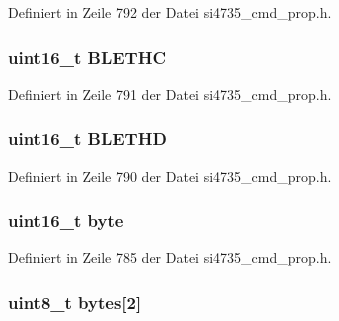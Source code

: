 Definiert in Zeile 792 der Datei si4735\+\_\+cmd\+\_\+prop.\+h.

\hypertarget{unionfm__rds__config_a19e09ee442964285a5affbdbe4d59795}{}
\subsubsection[{B\+L\+E\+T\+H\+C}]{\setlength{\rightskip}{0pt plus 5cm}uint16\+\_\+t B\+L\+E\+T\+H\+C}\label{unionfm__rds__config_a19e09ee442964285a5affbdbe4d59795}


Definiert in Zeile 791 der Datei si4735\+\_\+cmd\+\_\+prop.\+h.

\hypertarget{unionfm__rds__config_aa256d0f762bc9c1ba9fd6f9ee0047d4e}{}
\subsubsection[{B\+L\+E\+T\+H\+D}]{\setlength{\rightskip}{0pt plus 5cm}uint16\+\_\+t B\+L\+E\+T\+H\+D}\label{unionfm__rds__config_aa256d0f762bc9c1ba9fd6f9ee0047d4e}


Definiert in Zeile 790 der Datei si4735\+\_\+cmd\+\_\+prop.\+h.

\hypertarget{unionfm__rds__config_ab0549c1b5ea980a02e7eab77e21fea49}{}
\subsubsection[{byte}]{\setlength{\rightskip}{0pt plus 5cm}uint16\+\_\+t byte}\label{unionfm__rds__config_ab0549c1b5ea980a02e7eab77e21fea49}


Definiert in Zeile 785 der Datei si4735\+\_\+cmd\+\_\+prop.\+h.

\hypertarget{unionfm__rds__config_a46e4c05d20a047ec169f60d3167e912e}{}
\subsubsection[{bytes}]{\setlength{\rightskip}{0pt plus 5cm}uint8\+\_\+t bytes\mbox{[}2\mbox{]}}\label{unionfm__rds__config_a46e4c05d20a047ec169f60d3167e912e}


